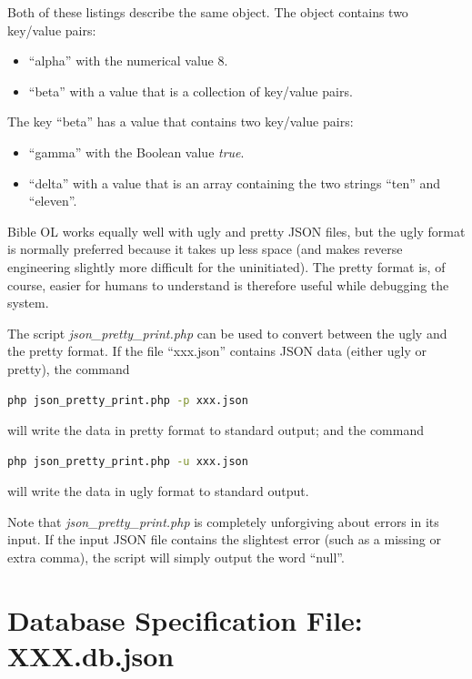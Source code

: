\documentclass[11pt,oneside,a4paper]{memoir}
\begin{document}
Both of these listings describe the same object. The object contains two key/value pairs:

\begin{itemize}
\item ``alpha'' with the numerical value 8.
\item ``beta'' with a value that is a collection of key/value pairs.
\end{itemize}

The key ``beta'' has a value that contains two key/value pairs:

\begin{itemize}
\item ``gamma'' with the Boolean value \emph{true}.
\item ``delta'' with a value that is an array containing the two strings ``ten'' and ``eleven''.
\end{itemize}


Bible OL works equally well with ugly and pretty JSON files, but the ugly format is normally
preferred because it takes up less space (and makes reverse engineering slightly more difficult for
the uninitiated). The pretty format is, of course, easier for humans to understand is therefore useful
while debugging the system.

The script \emph{json\_pretty\_print.php} can be used to convert between the ugly and the pretty
format. If the file ``xxx.json'' contains JSON data (either ugly or pretty), the command

\begin{lstlisting}[language=bash]
php json_pretty_print.php -p xxx.json
\end{lstlisting}

\noindent
will write the data in pretty format to standard output; and the command

\begin{lstlisting}[language=bash]
php json_pretty_print.php -u xxx.json
\end{lstlisting}

\noindent
will write the data in ugly format to standard output.

Note that \emph{json\_pretty\_print.php} is completely unforgiving about errors in its input. If the
input JSON file contains the slightest error (such as a missing or extra comma), the script will
simply output the word ``null''.


\section{Database Specification File: XXX.db.json}\label{sec-dsf}
\end{document}
